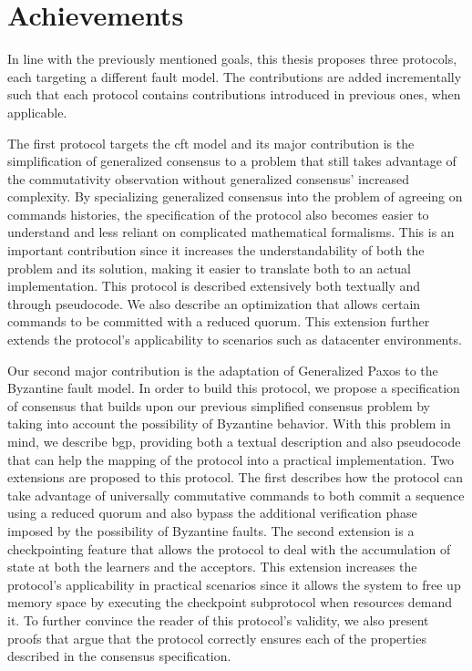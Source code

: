 \section{Achievements}
In line with the previously mentioned goals, this thesis proposes three protocols, each targeting a different fault model. The contributions are added incrementally such that each protocol contains contributions introduced in previous ones, when applicable. \par
The first protocol targets the \acrshort{cft} model and its major contribution is the simplification of generalized consensus to a problem that still takes advantage of the commutativity observation without generalized consensus' increased complexity. By specializing generalized consensus into the problem of agreeing on commands histories, the specification of the protocol also becomes easier to understand and less reliant on complicated mathematical formalisms. This is an important contribution since it increases the understandability of both the problem and its solution, making it easier to translate both to an actual implementation. This protocol is described extensively both textually and through pseudocode. We also describe an optimization that allows certain commands to be committed with a reduced quorum. This extension further extends the protocol's applicability to scenarios such as datacenter environments.\par
Our second major contribution is the adaptation of Generalized Paxos to the Byzantine fault model. In order to build this protocol, we propose a specification of consensus that builds upon our previous simplified consensus problem by taking into account the possibility of Byzantine behavior. With this problem in mind, we describe \acrlong{bgp}, providing both a textual description and also pseudocode that can help the mapping of the protocol into a practical implementation. Two extensions are proposed to this protocol. The first describes how the protocol can take advantage of universally commutative commands to both commit a sequence using a reduced quorum and also bypass the additional verification phase imposed by the possibility of Byzantine faults. The second extension is a checkpointing feature that allows the protocol to deal with the accumulation of state at both the learners and the acceptors. This extension increases the protocol's applicability in practical scenarios since it allows the system to free up memory space by executing the checkpoint subprotocol when resources demand it. To further convince the reader of this protocol's validity, we also present proofs that argue that the protocol correctly ensures each of the properties described in the consensus specification.\par
